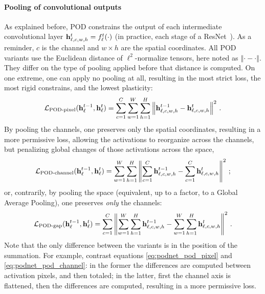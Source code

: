 \paragraph{Pooling of convolutional outputs} As explained before, POD constrains the output of each
intermediate convolutional layer $\mathbf{h}^{t}_{\ell,c,w,h} = f^{t}_\ell(\cdot)$ (in practice, each stage
of a ResNet~\citep{he2016resnet}). As a reminder, $c$ is the channel and $w\times h$ are the spatial
coordinates. All POD variants use the Euclidean distance of $\ell^2$-normalize tensors, here noted
as $\left\Vert\cdot-\cdot\right\Vert$. They differ on the type of pooling applied before that
distance is computed.
%
On one extreme, one can apply no pooling at all, resulting in the most strict loss, the most rigid
constrains, and the lowest plasticity:
%
\begin{equation}
    \mathcal{L}_{\text{POD-pixel}}(\mathbf{h}^{t-1}_\ell, \mathbf{h}^t_\ell) = \sum_{c=1}^C \sum_{w=1}^{W} \sum_{h=1}^{H} \left\Vert \mathbf{h}^{t-1}_{\ell,c,w,h} - \mathbf{h}^t_{\ell,c,w,h} \right\Vert^2\,.
    \label{eq:podnet_pod_pixel}
\end{equation}
%
By pooling the channels, one preserves only the spatial coordinates, resulting in a more permissive
loss, allowing the activations to reorganize across the channels, but penalizing global changes of
those activations across the space,
%
\begin{equation}
    \mathcal{L}_{\text{POD-channel}}(\mathbf{h}^{t-1}_\ell, \mathbf{h}^t_\ell)  = \sum_{w=1}^{W} \sum_{h=1}^{H} \left\Vert \sum_{c=1}^C \mathbf{h}^{t-1}_{\ell,c,w,h} - \sum_{c=1}^C \mathbf{h}^{t}_{\ell,c,w,h} \right\Vert^2\,;
    \label{eq:podnet_pod_channel}
\end{equation}
%
or, contrarily, by pooling the space (equivalent, up to a factor, to a Global Average Pooling), one
preserves \textit{only} the channels:
%
\begin{equation}
    \mathcal{L}_{\text{POD-gap}}(\mathbf{h}^{t-1}_\ell, \mathbf{h}^t_\ell) = \sum_{c=1}^{C} \left\Vert \sum_{w=1}^{W} \sum_{h=1}^H \mathbf{h}^{t-1}_{\ell,c,w,h} - \sum_{w=1}^{W} \sum_{h=1}^H \mathbf{h}^{t}_{\ell,c,w,h} \right\Vert^2\,.
    \label{eq:podnet_pod_gap}
\end{equation}
%
Note that the only difference between the variants is in the position of the summation. For example,
contrast equations \autoref{eq:podnet_pod_pixel} and \ref{eq:podnet_pod_channel}: in the former the
differences are computed between activation pixels, and then totaled; in the latter, first the
channel axis is flattened, then the differences are computed, resulting in a more permissive loss.

